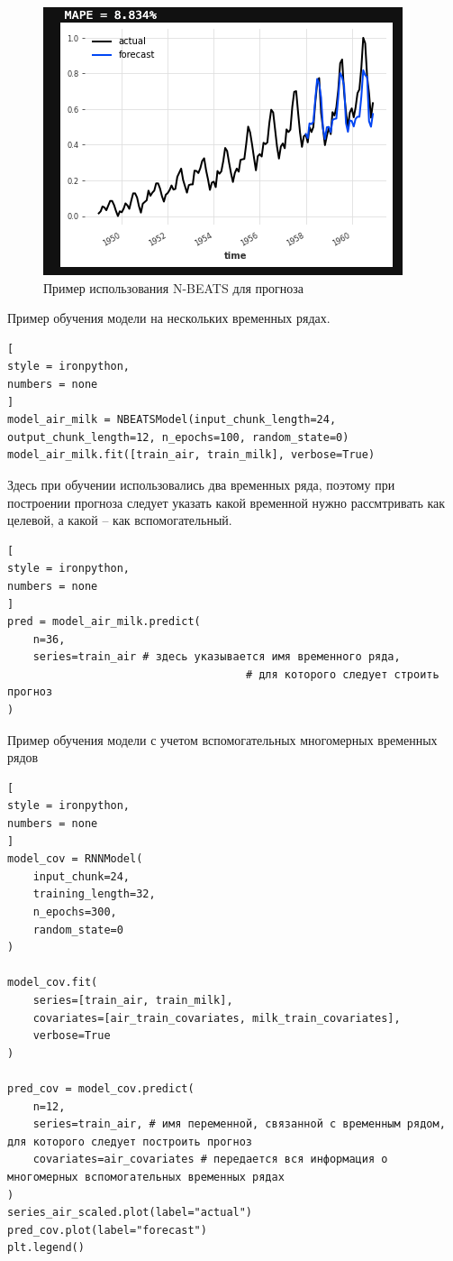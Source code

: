 \documentclass[%
	11pt,
	a4paper,
	utf8,
		]{article}
\begin{document}
\begin{figure}[h]
	\centering
	\includegraphics[scale=0.65]{figures/darts_nbeats_air_pred.png}
	\caption{ Пример использования N-BEATS для прогноза }\label{fig:darts_nbeats_air_pred}
\end{figure}

Пример обучения модели на нескольких временных рядах.
\begin{lstlisting}[
style = ironpython,
numbers = none	
]
model_air_milk = NBEATSModel(input_chunk_length=24, output_chunk_length=12, n_epochs=100, random_state=0)
model_air_milk.fit([train_air, train_milk], verbose=True)
\end{lstlisting}

Здесь при обучении использовались два временных ряда, поэтому при построении прогноза следует указать какой временной нужно рассмтривать как целевой, а какой -- как вспомогательный.

\begin{lstlisting}[
style = ironpython,
numbers = none	
]
pred = model_air_milk.predict(
    n=36,
    series=train_air # здесь указывается имя временного ряда,
                                     # для которого следует строить прогноз
)
\end{lstlisting}

Пример обучения модели с учетом вспомогательных многомерных временных рядов
\begin{lstlisting}[
style = ironpython,
numbers = none
]
model_cov = RNNModel(
    input_chunk=24,
    training_length=32,
    n_epochs=300,
    random_state=0
)

model_cov.fit(
    series=[train_air, train_milk],
    covariates=[air_train_covariates, milk_train_covariates],
    verbose=True
)

pred_cov = model_cov.predict(
    n=12,
    series=train_air, # имя переменной, связанной с временным рядом, для которого следует построить прогноз
    covariates=air_covariates # передается вся информация о многомерных вспомогательных временных рядах
)
series_air_scaled.plot(label="actual")
pred_cov.plot(label="forecast")
plt.legend()
\end{lstlisting}
\end{document}
